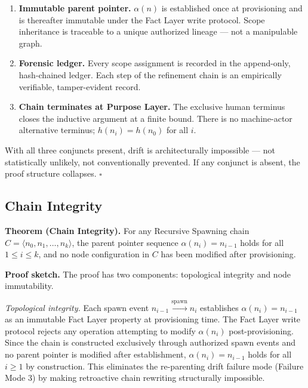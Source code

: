 \begin{enumerate}
    \item[(1)] \textbf{Immutable parent pointer.} $\alpha(n)$ is established once at provisioning and is thereafter immutable under the Fact Layer write protocol. Scope inheritance is traceable to a unique authorized lineage — not a manipulable graph.
    \item[(2)] \textbf{Forensic ledger.} Every scope assignment is recorded in the append-only, hash-chained ledger. Each step of the refinement chain is an empirically verifiable, tamper-evident record.
    \item[(3)] \textbf{Chain terminates at Purpose Layer.} The exclusive human terminus closes the inductive argument at a finite bound. There is no machine-actor alternative terminus; $h(n_i) = h(n_0)$ for all $i$.
\end{enumerate}

With all three conjuncts present, drift is architecturally impossible — not statistically unlikely, not conventionally prevented. If any conjunct is absent, the proof structure collapses. $\square$

\subsection{Chain Integrity}
\label{sec:rs-chain-integrity}

\medskip
\noindent\textbf{Theorem (Chain Integrity).} For any Recursive Spawning chain $C = \langle n_0, n_1, \ldots, n_k \rangle$, the parent pointer sequence $\alpha(n_i) = n_{i-1}$ holds for all $1 \leq i \leq k$, and no node configuration in $C$ has been modified after provisioning.

\medskip
\noindent\textbf{Proof sketch.} The proof has two components: topological integrity and node immutability.

\medskip
\textit{Topological integrity.} Each spawn event $n_{i-1} \xrightarrow{\text{spawn}} n_i$ establishes $\alpha(n_i) = n_{i-1}$ as an immutable Fact Layer property at provisioning time. The Fact Layer write protocol rejects any operation attempting to modify $\alpha(n_i)$ post-provisioning. Since the chain is constructed exclusively through authorized spawn events and no parent pointer is modified after establishment, $\alpha(n_i) = n_{i-1}$ holds for all $i \geq 1$ by construction. This eliminates the re-parenting drift failure mode (Failure Mode 3) by making retroactive chain rewriting structurally impossible.

